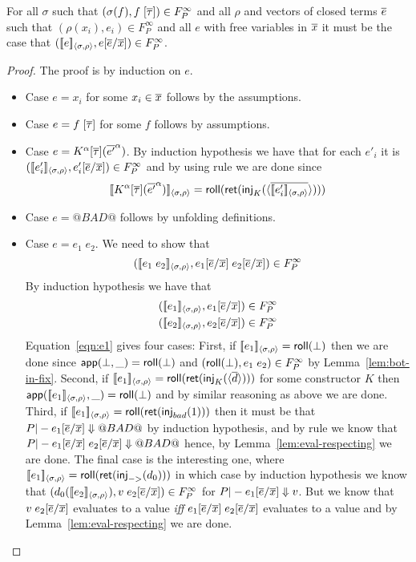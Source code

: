 \documentclass[preprint,nocopyrightspace,draft]{sigplanconf}
\begin{document}
\begin{lemma}\label{lem:fund-thm-exp}
For all $\sigma$ such that $(\sigma(f),f\;[\overline{\tau}]) \in F_P^\infty$ and 
all $\rho$ and vectors of closed terms $\overline{e}$ such that $(\rho(x_i),e_i) \in F_P^\infty$ 
and all $e$ with free variables in $\overline{x}$ it must be the case 
that $([\![e]\!]_{\langle {\sigma},{\rho}\rangle},e[\overline{e}/\overline{x}]) \in F_P^\infty$.
\end{lemma}
\begin{proof} The proof is by induction on $e$. 
\begin{itemize}
  \item Case $e = x_i$ for some $x_i \in \overline{x}$ follows by the assumptions.
  \item Case $e = f\;[\overline{\tau}]$ for some $f$ follows by assumptions.
  \item Case $e = K^\alpha[\overline{\tau}](\overline{e'}^{\alpha})$. By induction hypothesis we 
  have that for each $e'_i$ it is $([\![e'_i]\!]_{\langle {\sigma},{\rho}\rangle},e'_i[\overline{e}/\overline{x}]) \in F_P^\infty$ and 
  by using rule  we are done since 
      \[ [\![K^{\alpha}[\overline{\tau}](\overline{e'}^{\alpha})]\!]_{\langle {\sigma},{\rho}\rangle} = \mathsf{roll}(\mathsf{ret}(\mathsf{inj}_{K}(\langle\overline{[\![e'_i]\!]_{\langle {\sigma},{\rho}\rangle}}\rangle))) \]
  \item Case $e = @BAD@$ follows by unfolding definitions.
  \item Case $e = e_1\;e_2$. We need to show that
     \[ ([\![e_1\;e_2]\!]_{\langle {\sigma},{\rho}\rangle},e_1[\overline{e}/\overline{x}]\;e_2[\overline{e}/\overline{x}]) \in F_P^\infty \] 
  By induction hypothesis we have that 
  \begin{eqnarray}
     ([\![e_1]\!]_{\langle {\sigma},{\rho}\rangle},e_1[\overline{e}/\overline{x}]) \in F_P^\infty \label{eqn:e1} \\ 
     ([\![e_2]\!]_{\langle {\sigma},{\rho}\rangle},e_2[\overline{e}/\overline{x}]) \in F_P^\infty \label{eqn:e2}
  \end{eqnarray}
  Equation~\ref{eqn:e1} gives four cases: First, if $[\![e_1]\!]_{\langle {\sigma},{\rho}\rangle} = \mathsf{roll}(\bot)$ then we 
  are done since $\mathsf{app}(\bot,\_) = \mathsf{roll}(\bot)$ and $(\mathsf{roll}(\bot), e_1\;e_2) \in F_P^\infty$ by Lemma~\ref{lem:bot-in-fix}.
  Second, if $[\![e_1]\!]_{\langle {\sigma},{\rho}\rangle} = \mathsf{roll}(\mathsf{ret}(\mathsf{inj}_{K}(\langle\overline{d}\rangle)))$ for some constructor
  $K$ then $\mathsf{app}([\![e_1]\!]_{\langle {\sigma},{\rho}\rangle},\_) = \mathsf{roll}(\bot)$ and by similar reasoning as above we are done.
  Third, if $[\![e_1]\!]_{\langle {\sigma},{\rho}\rangle} = \mathsf{roll}(\mathsf{ret}(\mathsf{inj}_{bad}(1)))$ then it must be that $P |- e_1[\overline{e}/\overline{x}] \Downarrow @BAD@$ by
  induction hypothesis, and by rule  we know that $P |- e_1[\overline{e}/\overline{x}]\;e_2[\overline{e}/\overline{x}] \Downarrow @BAD@$ hence, 
  by Lemma~\ref{lem:eval-respecting} we are done. The final case is the interesting one, where
  $[\![e_1]\!]_{\langle {\sigma},{\rho}\rangle} = \mathsf{roll}(\mathsf{ret}(\mathsf{inj}_{->}(d_0)))$ in which case by induction hypothesis we know that 
  $(d_0([\![e_2]\!]_{\langle {\sigma},{\rho}\rangle}), v\;e_2[\overline{e}/\overline{x}]) \in F_P^\infty$ for $P |- e_1[\overline{e}/\overline{x}] \Downarrow v$. But we know that 
  $v\;e_2[\overline{e}/\overline{x}]$ evaluates to a value {\em iff} $e_1[\overline{e}/\overline{x}]\;e_2[\overline{e}/\overline{x}]$ evaluates to a value and by 
  Lemma~\ref{lem:eval-respecting} we are done.
\end{itemize}
\end{proof}
\end{document}
